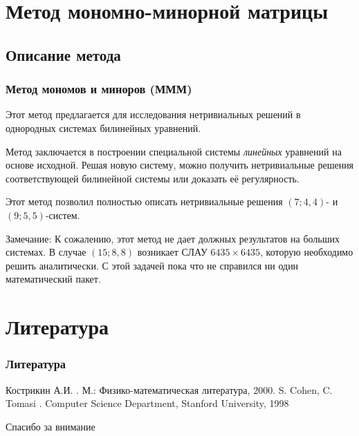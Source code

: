 \documentclass[russian,hyperref={unicode}]{beamer}
\begin{document}
\section{Метод мономно-минорной матрицы}
\subsection{Описание метода}
\frame
{
	\frametitle{Метод мономов и миноров (МММ)}
	Этот метод предлагается для исследования 
	нетривиальных решений в однородных системах билинейных уравнений.

	Метод заключается в построении специальной системы \textit{линейных} 
	уравнений на основе исходной. Решая новую систему, можно получить нетривиальные 
	решения соответствующей билинейной системы или доказать её регулярность.
	
	Этот метод позволил полностью описать нетривиальные решения $(7; 4, 4)$- и $(9; 
	5,5)$-систем.

	\begin{alertblock}{Замечание:}
		К сожалению, этот метод не дает должных результатов на больших системах. В случае 
		$(15; 8, 8)$ возникает СЛАУ $6435 \times 6435$, которую необходимо решить 
		аналитически. С этой задачей пока что не справился ни один математический 
		пакет.
	\end{alertblock}
}
\section{Литература}
\frame
{
	\frametitle{Литература}
	\begin{thebibliography}{10}
	\beamertemplatebookbibitems
    	Кострикин А.И. 
    	.
    	\newblock М.: Физико-математическая литература, 2000.
	\beamertemplatearticlebibitems
    	S. Cohen, C. Tomasi
    	.
    	\newblock Computer Science Department, Stanford University, 1998
    \end{thebibliography}
}
\frame
{
	\begin{center}
		\huge Спасибо за внимание
	\end{center}
}
\end{document}
